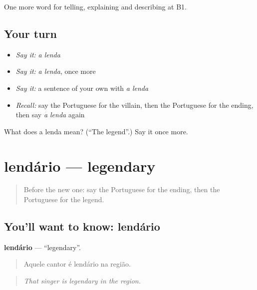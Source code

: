 \begin{grammarlens}[title={What you've built}]
One more word for telling, explaining and describing at B1.
\end{grammarlens}

\subsection*{Your turn}
\begin{itemize}
\raggedright
  \item \emph{Say it:} \emph{a lenda}
  \item \emph{Say it:} \emph{a lenda}, once more
  \item \emph{Say it:} a sentence of your own with \emph{a lenda}
  \item \emph{Recall:} say the Portuguese for the villain, then the Portuguese for the ending, then say \emph{a lenda} again
\end{itemize}

\begin{tcolorbox}[breakable,colback=teal!4,colframe=teal!35!black,title={Before you move on}]
What does a lenda mean? (\textquotedblleft{}The legend\textquotedblright{}.) Say it once more.
\end{tcolorbox}
\section[lendário]{lendário — legendary}

\label{lesson:PT-C326-lendario}



\begin{quote}
Before the new one: say the Portuguese for the ending, then the Portuguese for the legend.
\end{quote}

\subsection*{You'll want to know: lendário}
\textbf{lendário} — \textquotedblleft{}legendary\textquotedblright{}.

\begin{quote}
Aquele cantor é lendário na região.
\end{quote}

\begin{quote}
\emph{That singer is legendary in the region.}
\end{quote}

